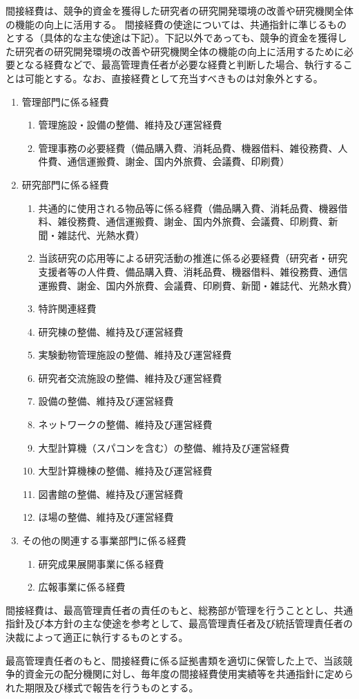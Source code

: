 \documentclass[10pt,a4paper,uplatex]{jsarticle}
\begin{document}
間接経費は、競争的資金を獲得した研究者の研究開発環境の改善や研究機関全体の機能の向上に活用する。
\term 間接経費の使途については、共通指針に準じるものとする（具体的な主な使途は下記）。下記以外であっても、競争的資金を獲得した研究者の研究開発環境の改善や研究機関全体の機能の向上に活用するために必要となる経費などで、最高管理責任者が必要な経費と判断した場合、執行することは可能とする。なお、直接経費として充当すべきものは対象外とする。
\begin{enumerate}
	\item 管理部門に係る経費
		\begin{enumerate}
			\item 管理施設・設備の整備、維持及び運営経費 
			\item 管理事務の必要経費（備品購入費、消耗品費、機器借料、雑役務費、人件費、通信運搬費、謝金、国内外旅費、会議費、印刷費）
		\end{enumerate}
	\item 研究部門に係る経費
		\begin{enumerate}
			\item 共通的に使用される物品等に係る経費（備品購入費、消耗品費、機器借料、雑役務費、通信運搬費、謝金、国内外旅費、会議費、印刷費、新聞・雑誌代、光熱水費）
			\item 当該研究の応用等による研究活動の推進に係る必要経費（研究者・研究支援者等の人件費、備品購入費、消耗品費、機器借料、雑役務費、通信運搬費、謝金、国内外旅費、会議費、印刷費、新聞・雑誌代、光熱水費）
			\item 特許関連経費
			\item 研究棟の整備、維持及び運営経費
			\item 実験動物管理施設の整備、維持及び運営経費
			\item 研究者交流施設の整備、維持及び運営経費
			\item 設備の整備、維持及び運営経費
			\item ネットワークの整備、維持及び運営経費
			\item 大型計算機（スパコンを含む）の整備、維持及び運営経費
			\item 大型計算機棟の整備、維持及び運営経費
			\item 図書館の整備、維持及び運営経費
			\item ほ場の整備、維持及び運営経費
		\end{enumerate}
	\item その他の関連する事業部門に係る経費
		\begin{enumerate}
			\item 研究成果展開事業に係る経費
			\item 広報事業に係る経費 
		\end{enumerate}
\end{enumerate}

間接経費は、最高管理責任者の責任のもと、総務部が管理を行うこととし、共通指針及び本方針の主な使途を参考として、最高管理責任者及び統括管理責任者の決裁によって適正に執行するものとする。

最高管理責任者のもと、間接経費に係る証拠書類を適切に保管した上で、当該競争的資金元の配分機関に対し、毎年度の間接経費使用実績等を共通指針に定められた期限及び様式で報告を行うものとする。
\end{document}
